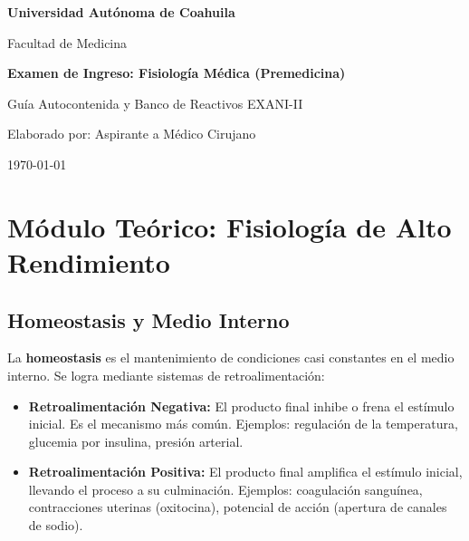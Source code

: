 \documentclass[spanish,letterpaper,oneside]{article}
\begin{document}
\begin{titlepage}
    \centering
    \vspace*{2cm}
    {\Huge \textbf{Universidad Autónoma de Coahuila} \par}
    \vspace{1cm}
    {\Large Facultad de Medicina \par}
    \vspace{2cm}
    {\LARGE \textbf{Examen de Ingreso: Fisiología Médica (Premedicina)} \par}
    \vspace{1cm}
    {\Large Guía Autocontenida y Banco de Reactivos EXANI-II \par}
    \vspace{3cm}
    {\large Elaborado por: Aspirante a Médico Cirujano \par}
    \vfill
    {\large \today \par}
\end{titlepage}

\tableofcontents
\newpage

\section{Módulo Teórico: Fisiología de Alto Rendimiento}
\subsection{Homeostasis y Medio Interno}
La \textbf{homeostasis} es el mantenimiento de condiciones casi constantes en el medio interno. Se logra mediante sistemas de retroalimentación:
\begin{itemize}
    \item \textbf{Retroalimentación Negativa:} El producto final inhibe o frena el estímulo inicial. Es el mecanismo más común. Ejemplos: regulación de la temperatura, glucemia por insulina, presión arterial.
    \item \textbf{Retroalimentación Positiva:} El producto final amplifica el estímulo inicial, llevando el proceso a su culminación. Ejemplos: coagulación sanguínea, contracciones uterinas (oxitocina), potencial de acción (apertura de canales de sodio).
\end{itemize}
\end{document}
